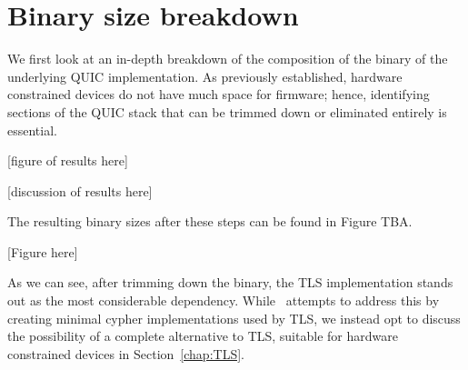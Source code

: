 \section{Binary size breakdown} \label{sec:binary_sizes}

We first look at an in-depth breakdown of the composition of the binary of the underlying QUIC implementation.
As previously established, hardware constrained devices do not have much space for firmware; hence, identifying sections of the QUIC stack that can be trimmed down or eliminated entirely is essential.

[figure of results here]

[discussion of results here]

The resulting binary sizes after these steps can be found in Figure TBA.

[Figure here]

As we can see, after trimming down the binary, the TLS implementation stands out as the most considerable dependency.
While~\cite{eggert_towards_2020} attempts to address this by creating minimal cypher implementations used by TLS, we instead opt to discuss the possibility of a complete alternative to TLS, suitable for hardware constrained devices in Section~\ref{chap:TLS}.
